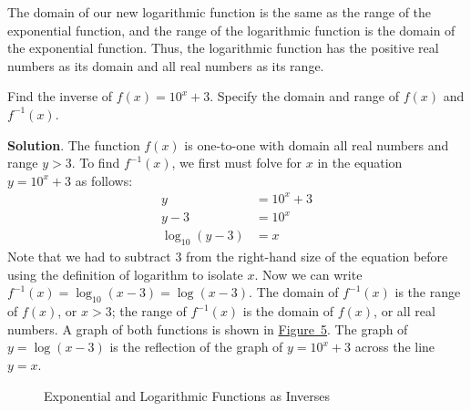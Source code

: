\documentclass[10pt,]{book}
\theoremstyle{ptxdefinitionnotitle}
\theoremstyle{ptxdefinitiontitle}
\theoremstyle{ptxdefinitionnotitle}
\theoremstyle{ptxdefinitiontitle}
\theoremstyle{ptxdefinitionnotitle}
\theoremstyle{ptxdefinitiontitle}
\numberwithin{equation}{section}
\newcommand{\amp}{&}
\begin{document}
\hypertarget{p-328}{}%
The domain of our new logarithmic function is the same as the range of the exponential function, and the range of the logarithmic function is the domain of the exponential function. Thus, the logarithmic function has the positive real numbers as its domain and all real numbers as its range.%
\begin{example}[{.}]\label{example-25}
\hypertarget{p-329}{}%
Find the inverse of \(f(x) = 10^x + 3\). Specify the domain and range of \(f(x)\) and \(f^{-1}(x)\).%
\par\smallskip%
\noindent\textbf{Solution}.\hypertarget{solution-25}{}\quad%
\hypertarget{p-330}{}%
The function \(f(x)\) is one-to-one with domain all real numbers and range \(y > 3\). To find \(f^{-1}(x)\), we first must folve for \(x\) in the equation \(y = 10^x + 3\) as follows:%
\begin{align*}
y \amp= 10^x + 3\\
y - 3 \amp= 10^x\\
\log_{10} \left( y - 3 \right) \amp= x
\end{align*}
Note that we had to subtract \(3\) from the right-hand size of the equation before using the definition of logarithm to isolate \(x\). Now we can write \(f^{-1}(x) = \log_{10} \left( x - 3 \right) = \log \left( x - 3 \right) \). The domain of \(f^{-1}(x)\) is the range of \(f(x)\), or \(x > 3\); the range of \(f^{-1}(x)\) is the domain of \(f(x)\), or all real numbers. A graph of both functions is shown in \hyperref[exponential-log-inverses-example]{Figure~5}. The graph of \(y = \log \left( x - 3 \right)\) is the reflection of the graph of \(y = 10^x + 3\) across the line \(y = x\).%
\begin{figure}
\centering
{
}
\caption{Exponential and Logarithmic Functions as Inverses\label{exponential-log-inverses-example}}
\end{figure}
\end{example}
\typeout{************************************************}
\typeout{************************************************}
\end{document}

